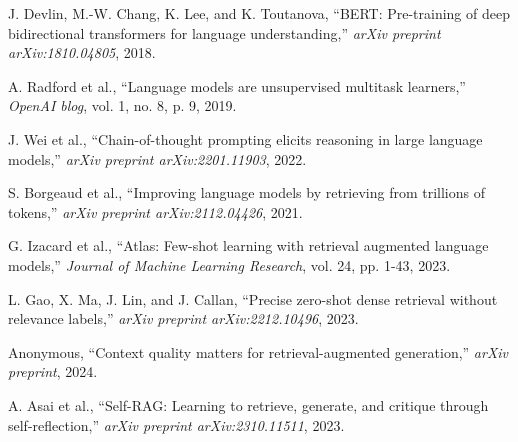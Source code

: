 \documentclass[conference]{IEEEtran}
\begin{document}
\begin{thebibliography}{99}
J. Devlin, M.-W. Chang, K. Lee, and K. Toutanova, ``BERT: Pre-training of deep bidirectional transformers for language understanding,'' \textit{arXiv preprint arXiv:1810.04805}, 2018.

A. Radford et al., ``Language models are unsupervised multitask learners,'' \textit{OpenAI blog}, vol. 1, no. 8, p. 9, 2019.

J. Wei et al., ``Chain-of-thought prompting elicits reasoning in large language models,'' \textit{arXiv preprint arXiv:2201.11903}, 2022.

S. Borgeaud et al., ``Improving language models by retrieving from trillions of tokens,'' \textit{arXiv preprint arXiv:2112.04426}, 2021.

G. Izacard et al., ``Atlas: Few-shot learning with retrieval augmented language models,'' \textit{Journal of Machine Learning Research}, vol. 24, pp. 1-43, 2023.

L. Gao, X. Ma, J. Lin, and J. Callan, ``Precise zero-shot dense retrieval without relevance labels,'' \textit{arXiv preprint arXiv:2212.10496}, 2023.

Anonymous, ``Context quality matters for retrieval-augmented generation,'' \textit{arXiv preprint}, 2024.

A. Asai et al., ``Self-RAG: Learning to retrieve, generate, and critique through self-reflection,'' \textit{arXiv preprint arXiv:2310.11511}, 2023.

\end{thebibliography}
\end{document}
